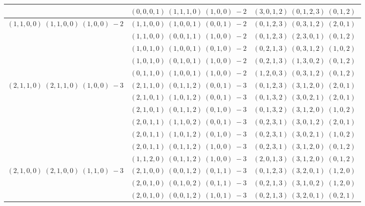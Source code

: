 \documentclass[11pt]{article}
\begin{document}
\begin{longtable}[l]{|c|c|c|}
 \cline{2-3} 
 & $(0 ,0 ,0 ,1) \;(1 ,1 ,1 ,0) \;(1 ,0 ,0) \;-2$ & $(3 ,0 ,1 ,2) \;(0 ,1 ,2 ,3) \;(0 ,1 ,2) \;$\\ \hline\multirow[t]{5}{*}{ $(1 ,1 ,0 ,0) \;(1 ,1 ,0 ,0) \;(1 ,0 ,0) \;-2$ }  & $(1 ,1 ,0 ,0) \;(1 ,0 ,0 ,1) \;(0 ,0 ,1) \;-2$ & $(0 ,1 ,2 ,3) \;(0 ,3 ,1 ,2) \;(2 ,0 ,1) \;$\\ 
 \cline{2-3} 
 & $(1 ,1 ,0 ,0) \;(0 ,0 ,1 ,1) \;(1 ,0 ,0) \;-2$ & $(0 ,1 ,2 ,3) \;(2 ,3 ,0 ,1) \;(0 ,1 ,2) \;$\\ 
 \cline{2-3} 
 & $(1 ,0 ,1 ,0) \;(1 ,0 ,0 ,1) \;(0 ,1 ,0) \;-2$ & $(0 ,2 ,1 ,3) \;(0 ,3 ,1 ,2) \;(1 ,0 ,2) \;$\\ 
 \cline{2-3} 
 & $(1 ,0 ,1 ,0) \;(0 ,1 ,0 ,1) \;(1 ,0 ,0) \;-2$ & $(0 ,2 ,1 ,3) \;(1 ,3 ,0 ,2) \;(0 ,1 ,2) \;$\\ 
 \cline{2-3} 
 & $(0 ,1 ,1 ,0) \;(1 ,0 ,0 ,1) \;(1 ,0 ,0) \;-2$ & $(1 ,2 ,0 ,3) \;(0 ,3 ,1 ,2) \;(0 ,1 ,2) \;$\\ \hline\multirow[t]{7}{*}{ $(2 ,1 ,1 ,0) \;(2 ,1 ,1 ,0) \;(1 ,0 ,0) \;-3$ }  & $(2 ,1 ,1 ,0) \;(0 ,1 ,1 ,2) \;(0 ,0 ,1) \;-3$ & $(0 ,1 ,2 ,3) \;(3 ,1 ,2 ,0) \;(2 ,0 ,1) \;$\\ 
 \cline{2-3} 
 & $(2 ,1 ,0 ,1) \;(1 ,0 ,1 ,2) \;(0 ,0 ,1) \;-3$ & $(0 ,1 ,3 ,2) \;(3 ,0 ,2 ,1) \;(2 ,0 ,1) \;$\\ 
 \cline{2-3} 
 & $(2 ,1 ,0 ,1) \;(0 ,1 ,1 ,2) \;(0 ,1 ,0) \;-3$ & $(0 ,1 ,3 ,2) \;(3 ,1 ,2 ,0) \;(1 ,0 ,2) \;$\\ 
 \cline{2-3} 
 & $(2 ,0 ,1 ,1) \;(1 ,1 ,0 ,2) \;(0 ,0 ,1) \;-3$ & $(0 ,2 ,3 ,1) \;(3 ,0 ,1 ,2) \;(2 ,0 ,1) \;$\\ 
 \cline{2-3} 
 & $(2 ,0 ,1 ,1) \;(1 ,0 ,1 ,2) \;(0 ,1 ,0) \;-3$ & $(0 ,2 ,3 ,1) \;(3 ,0 ,2 ,1) \;(1 ,0 ,2) \;$\\ 
 \cline{2-3} 
 & $(2 ,0 ,1 ,1) \;(0 ,1 ,1 ,2) \;(1 ,0 ,0) \;-3$ & $(0 ,2 ,3 ,1) \;(3 ,1 ,2 ,0) \;(0 ,1 ,2) \;$\\ 
 \cline{2-3} 
 & $(1 ,1 ,2 ,0) \;(0 ,1 ,1 ,2) \;(1 ,0 ,0) \;-3$ & $(2 ,0 ,1 ,3) \;(3 ,1 ,2 ,0) \;(0 ,1 ,2) \;$\\ \hline\multirow[t]{6}{*}{ $(2 ,1 ,0 ,0) \;(2 ,1 ,0 ,0) \;(1 ,1 ,0) \;-3$ }  & $(2 ,1 ,0 ,0) \;(0 ,0 ,1 ,2) \;(0 ,1 ,1) \;-3$ & $(0 ,1 ,2 ,3) \;(3 ,2 ,0 ,1) \;(1 ,2 ,0) \;$\\ 
 \cline{2-3} 
 & $(2 ,0 ,1 ,0) \;(0 ,1 ,0 ,2) \;(0 ,1 ,1) \;-3$ & $(0 ,2 ,1 ,3) \;(3 ,1 ,0 ,2) \;(1 ,2 ,0) \;$\\ 
 \cline{2-3} 
 & $(2 ,0 ,1 ,0) \;(0 ,0 ,1 ,2) \;(1 ,0 ,1) \;-3$ & $(0 ,2 ,1 ,3) \;(3 ,2 ,0 ,1) \;(0 ,2 ,1) \;$\\ 

\end{longtable}
\end{document}
